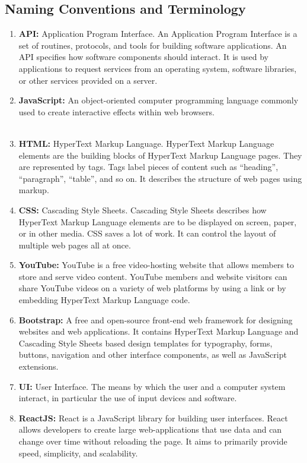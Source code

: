 \documentclass[12pt, titlepage]{article}
\begin{document}
\subsection{Naming Conventions and Terminology}
\begin{enumerate}\color{red}
  \item \textbf{API:} Application Program Interface. An Application Program Interface is a set of routines, protocols, and tools for building software applications. An API specifies how software components should interact. It is used by applications to request services from an operating system, software libraries, or other services provided on a server.
  \item \textbf{JavaScript:} An object-oriented computer programming language commonly used to create interactive effects within web browsers.
  \\\\
  \item \textbf{HTML:} HyperText Markup Language. HyperText Markup Language elements are the building blocks of HyperText Markup Language pages. They are represented by tags. Tags label pieces of content such as “heading”, “paragraph”, “table”, and so on. It describes the structure of web pages using markup.
  \item \textbf{CSS:} Cascading Style Sheets. Cascading Style Sheets describes how HyperText Markup Language elements are to be displayed on screen, paper, or in other media. CSS saves a lot of work. It can control the layout of multiple web pages all at once.
  \item \textbf{YouTube:} YouTube is a free video-hosting website that allows members to store and serve video content. YouTube members and website visitors can share YouTube videos on a variety of web platforms by using a link or by embedding HyperText Markup Language code.
   \item \textbf{Bootstrap:} A free and open-source front-end web framework for designing websites and web applications. It contains HyperText Markup Language and Cascading Style Sheets based design templates for typography, forms, buttons, navigation and other interface components, as well as JavaScript extensions.
  \item \textbf{UI:} User Interface. The means by which the user and a computer system interact, in particular the use of input devices and software.
  \item \textbf{ReactJS:} React is a JavaScript library for building user interfaces. React allows developers to create large web-applications that use data and can change over time without reloading the page. It aims to primarily provide speed, simplicity, and scalability.
\end{enumerate}
\color{black}
\end{document}
